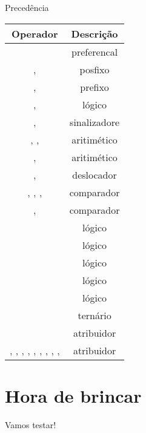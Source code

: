 \documentclass[11pt]{beamer}
\begin{document}
\begin{frame}{Precedência}
{\begin{table}[!h]
				\label{table.precedence}
				\begin{tabular}{cc}
					Operador & Descrição \\\hline
					\basicCode{()} & preferencal\\\hline\presentationPause
					\basicCode{++}, \basicCode{--} & posfixo \\\hline\presentationPause
					\basicCode{++}, \basicCode{--} & prefixo \\\hline\presentationPause
					\basicCode{\~}, \basicCode{!} & lógico \\\hline\presentationPause
					\basicCode{+}, \basicCode{-} & sinalizadore \\\hline\presentationPause
					\basicCode{*}, \basicCode{/}, \basicCode{\%} & aritimético \\
					\basicCode{+}, \basicCode{-} & aritimético \\\hline\presentationPause
					\basicCode{<<}, \basicCode{>>} & deslocador \\\hline\presentationPause
					\basicCode{<}, \basicCode{<=}, \basicCode{>=}, \basicCode{>} & comparador \\
					\basicCode{==}, \basicCode{!=} & comparador \\\hline\presentationPause
					\basicCode{\&} & lógico \\
					\basicCode{\^} & lógico \\
					\basicCode{|} & lógico \\
					\basicCode{\&\&} & lógico \\
					\basicCode{\|\|} & lógico \\\hline\presentationPause
					\basicCode{?:} & ternário \\ \hline\presentationPause
					\basicCode{=} & atribuidor \\
					\basicCode{+=}, \basicCode{-=}, \basicCode{*=}, \basicCode{/=}, \basicCode{\%=}, \basicCode{\&=}, \basicCode{\^=}, \basicCode{\|=}, \basicCode{<<=},  \basicCode{>>=} & atribuidor
				\end{tabular}
			\end{table}
		}
		{
			
		}
	\end{frame}
	
\section{Hora de brincar}
	\begin{frame}
		\begin{center}\Huge
			Vamos testar!
		\end{center}
	\end{frame}
\end{document}
